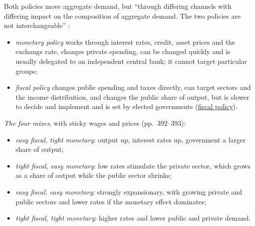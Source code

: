 \begin{qfmethod}\label{meth:monetary-fiscal-policy-mix}
 Both policies move aggregate demand, but ``through differing channels with differing impact on the composition of aggregate demand. The two policies are not interchangeable'' \citep[chap.~7, sec.~4, p.~392]{economics-investment-decision-makers-2013}:
\begin{itemize}
\item \emph{monetary policy} works through interest rates, credit, asset prices and the exchange rate, changes private spending, can be changed quickly and is usually delegated to an independent central bank; it cannot target particular groups;
\item \emph{fiscal policy} changes public spending and taxes directly, can target sectors and the income distribution, and changes the public share of output, but is slower to decide and implement and is set by elected governments (\hyperref[def:fiscal-policy-tools-stance]{fiscal policy}).
\end{itemize}

\emph{The four mixes}, with sticky wages and prices (pp.~392--393):
\begin{itemize}
\item \emph{easy fiscal, tight monetary}: output up, interest rates up, government a larger share of output;
\item \emph{tight fiscal, easy monetary}: low rates stimulate the private sector, which grows as a share of output while the public sector shrinks;
\item \emph{easy fiscal, easy monetary}: strongly expansionary, with growing private and public sectors and lower rates if the monetary effect dominates;
\item \emph{tight fiscal, tight monetary}: higher rates and lower public and private demand.
\end{itemize}


\end{qfmethod}
